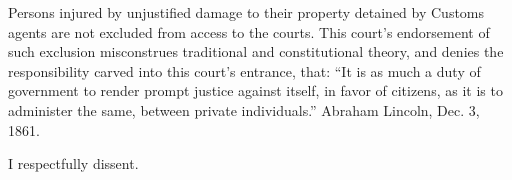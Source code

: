 
Persons injured by unjustified damage to their property detained by Customs
agents are not excluded from access to the courts. This court's endorsement of
such exclusion misconstrues traditional and constitutional theory, and denies
the responsibility carved into this court's entrance, that: ``It is as much a
duty of government to render prompt justice against itself, in favor of
citizens, as it is to administer the same, between private individuals.''
Abraham Lincoln, Dec. 3, 1861.

I respectfully dissent.

